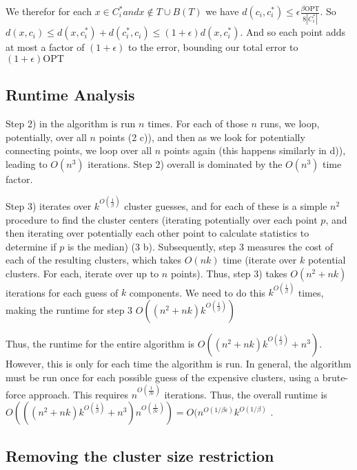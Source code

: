 \documentclass[paper=a4, fontsize=10.5pt]{scrartcl} %
\numberwithin{equation}{section} %
\numberwithin{figure}{section} %
\numberwithin{table}{section} %
\begin{document}
We therefor for each $x \in C_i^* and x\notin T\cup B(T)$ we have $d(c_i, c_i^*) \leq \epsilon\frac{\beta\text{OPT}}{8|C_i^*|}$. So $d(x, c_i) \leq d(x, c_i^*) + d(c_i^*, c_i) \leq (1+\epsilon)d(x,c_i^*)$. And so each point adds at most a factor of $(1+\epsilon)$ to the error, bounding our total error to $(1+\epsilon)\text{OPT}$





\subsection{Runtime Analysis}

Step 2) in the algorithm is run $n$ times.  For each of those $n$ runs, we loop, potentially, over all $n$  points (2 c)), and then as we look for potentially connecting points, we loop over all $n$  points again (this happens similarly in d)), leading to $O(n^3)$ iterations.  Step 2) overall is dominated by the $O(n^3)$ time factor.

Step 3) iterates over $k^{O(\frac{1}{\beta})}$ cluster guesses, and for each of these is a simple $n^2$ procedure to find the cluster centers (iterating potentially over each point $p$, and then iterating over potentially each other point to calculate statistics to determine if $p$ is the median)  (3 b).  Subsequently, step 3 measures the cost of each of the resulting clusters, which takes $O(nk)$ time (iterate over $k$ potential clusters.  For each, iterate over up to $n$ points).  Thus, step 3) takes $O(n^2 + nk)$ iterations for each guess of $k$ components.  We need to do this $k^{O(\frac{1}{\beta})}$ times, making the runtime for step 3 $O((n^2 + nk)k^{O(\frac{1}{\beta})})$

Thus, the runtime for the entire algorithm is $O((n^2 + nk)k^{O(\frac{1}{\beta})} + n^3)$.  However, this is only for each time the algorithm is run.  In general, the algorithm must be run once for each possible guess of the expensive clusters, using a brute-force approach.  This requires $n^{O(\frac{1}{\beta e})}$ iterations.  Thus, the overall runtime is $O(((n^2 + nk)k^{O(\frac{1}{\beta})}+n^3)n^{O(\frac{1}{\beta e})}) = O(n^{O(1/\beta\epsilon)}k^{O(1/\beta)}$ .

\subsection{Removing the cluster size restriction}
\end{document}
